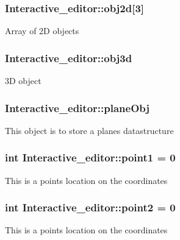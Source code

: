 \subsubsection[{\texorpdfstring{obj2d}{obj2d}}]{ Interactive\+\_\+editor\+::obj2d\mbox{[}3\mbox{]}}\hypertarget{classInteractive__editor_a61dd4318434d640cc5191e038b66a407}{}\label{classInteractive__editor_a61dd4318434d640cc5191e038b66a407}
Array of 2D objects 
\subsubsection[{\texorpdfstring{obj3d}{obj3d}}]{ Interactive\+\_\+editor\+::obj3d}\hypertarget{classInteractive__editor_a2620ec3a4c9f18e9cd873e2a90c1167d}{}\label{classInteractive__editor_a2620ec3a4c9f18e9cd873e2a90c1167d}
3D object 
\subsubsection[{\texorpdfstring{plane\+Obj}{planeObj}}]{ Interactive\+\_\+editor\+::plane\+Obj}\hypertarget{classInteractive__editor_aed0bc7a1d2cafae39f3fbf2eb119649c}{}\label{classInteractive__editor_aed0bc7a1d2cafae39f3fbf2eb119649c}
This object is to store a plane\textquotesingle{}s datastructure 
\subsubsection[{\texorpdfstring{point1}{point1}}]{\setlength{\rightskip}{0pt plus 5cm}int Interactive\+\_\+editor\+::point1 = 0}\hypertarget{classInteractive__editor_a07fe2897bcad8eabf5b98e01a162b2a1}{}\label{classInteractive__editor_a07fe2897bcad8eabf5b98e01a162b2a1}
This is a point\textquotesingle{}s location on the coordinates 
\subsubsection[{\texorpdfstring{point2}{point2}}]{\setlength{\rightskip}{0pt plus 5cm}int Interactive\+\_\+editor\+::point2 = 0}\hypertarget{classInteractive__editor_af60245cb328db4c6b1ca00f1512dfc75}{}\label{classInteractive__editor_af60245cb328db4c6b1ca00f1512dfc75}
This is a point\textquotesingle{}s location on the coordinates 
